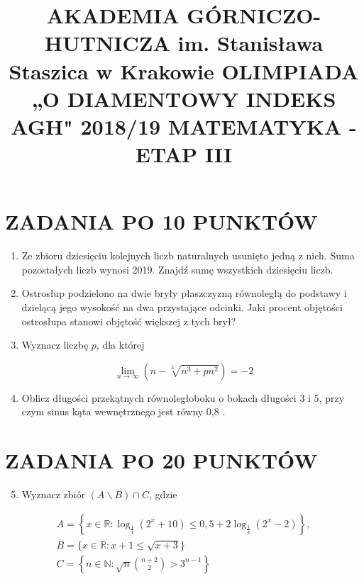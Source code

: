 \documentclass[10pt]{article}
\title{AKADEMIA GÓRNICZO-HUTNICZA im. Stanisława Staszica w Krakowie OLIMPIADA „O DIAMENTOWY INDEKS AGH" 2018/19 MATEMATYKA - ETAP III }
\author{}
\date{}
\begin{document}
\maketitle
\section*{ZADANIA PO 10 PUNKTÓW}
\begin{enumerate}
  \item Ze zbioru dziesięciu kolejnych liczb naturalnych usunięto jedną z nich. Suma pozostałych liczb wynosi 2019. Znajdź sumę wszystkich dziesięciu liczb.
  \item Ostrosłup podzielono na dwie bryły płaszczyzną równoległą do podstawy i dzielącą jego wysokość na dwa przystające odcinki. Jaki procent objętości ostrosłupa stanowi objętość większej z tych brył?
  \item Wyznacz liczbę $p$, dla której
\end{enumerate}

$$
\lim _{n \rightarrow \infty}\left(n-\sqrt[3]{n^{3}+p n^{2}}\right)=-2
$$

\begin{enumerate}
  \setcounter{enumi}{3}
  \item Oblicz długości przekątnych równoległoboku o bokach długości 3 i 5, przy czym sinus kąta wewnętrznego jest równy 0,8 .
\end{enumerate}

\section*{ZADANIA PO 20 PUNKTÓW}
\begin{enumerate}
  \setcounter{enumi}{4}
  \item Wyznacz zbiór $(A \backslash B) \cap C$, gdzie
\end{enumerate}

$$
\begin{gathered}
A=\left\{x \in \mathbb{R}: \log _{\frac{1}{4}}\left(2^{x}+10\right) \leqslant 0,5+2 \log _{\frac{1}{4}}\left(2^{x}-2\right)\right\}, \\
B=\{x \in \mathbb{R}: x+1 \leqslant \sqrt{x+3}\} \\
C=\left\{n \in \mathbb{N}: \sqrt{n}\binom{n+2}{2}>3^{n-1}\right\}
\end{gathered}
$$
\end{document}
